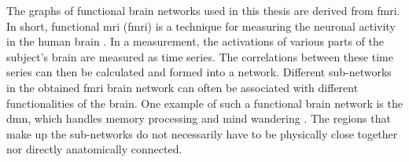 The graphs of functional brain networks used in this thesis are derived from \acrshort{fmri}. In short, functional \acrshort{mri} (\acrshort{fmri}) is a technique for measuring the neuronal activity in the human brain \cite{sporns}. In a measurement, the activations of various parts of the subject's brain are measured as time series. The correlations between these time series can then be calculated and formed into a network. Different sub-networks in the obtained \acrshort{fmri} brain network can often be associated with different functionalities of the brain. One example of such a functional brain network is the \acrfull{dmn}, which handles memory processing and mind wandering  \cite{alves_dmn}. The regions that make up the sub-networks do not necessarily have to be physically close together nor directly anatomically connected.



